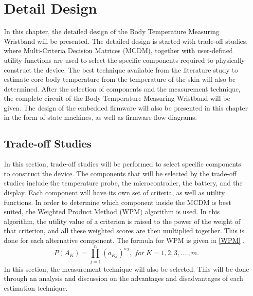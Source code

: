 \chapter{Detail Design}\label{Ch4}
In this chapter, the detailed design of the Body Temperature Measuring Wristband will be presented. The detailed design is started with trade-off studies, where Multi-Criteria Decision Matrices (MCDM), together with user-defined utility functions are used to select the specific components required to physically construct the device. The best technique available from the literature study to estimate core body temperature from the temperature of the skin will also be determined. After the selection of components and the measurement technique, the complete circuit of the Body Temperature Measuring Wristband will be given. The design of the embedded firmware will also be presented in this chapter in the form of state machines, as well as firmware flow diagrams.

\section{Trade-off Studies}
In this section, trade-off studies will be performed to select specific components to construct the device. The components that will be selected by the trade-off studies include the temperature probe, the microcontroller, the battery, and the display. Each component will have its own set of criteria, as well as utility functions. In order to determine which component inside the MCDM is best suited, the Weighted Product Method (WPM) algorithm is used. In this algorithm, the utility value of a criterion is raised to the power of the weight of that criterion, and all these weighted scores are then multiplied together. This is done for each alternative component. The formula for WPM is given in \autoref{WPM} \cite{MCDM2020}.
\begin{equation}
    P(A_{K}) = \prod_{j = 1}^{n} (a_{Kj})^{wj}, \;for \;K = 1, 2, 3,....,m.
    \label{WPM}
\end{equation}
\noindent
In this section, the measurement technique will also be selected. This will be done through an analysis and discussion on the advantages and disadvantages of each estimation technique.

